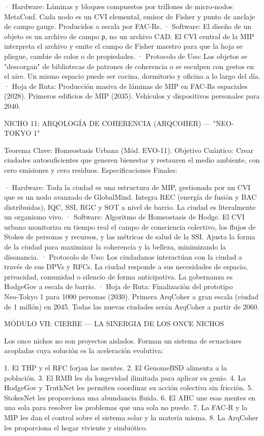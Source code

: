 \documentclass[12pt,a4paper]{book}
\begin{document}
· Hardware: Láminas y bloques compuestos por trillones de micro‑nodos MetaConf. Cada nodo es un CVI elemental, emisor de Fisher y punto de anclaje de campo gauge. Producidos a escala por FAC‑Rs.
· Software: El diseño de un objeto es un archivo de campo ρ, no un archivo CAD. El CVI central de la MIP interpreta el archivo y emite el campo de Fisher maestro para que la hoja se pliegue, cambie de color o de propiedades.
· Protocolo de Uso: Los objetos se "descorgan" de bibliotecas de patrones de coherencia o se esculpen con gestos en el aire. Un mismo espacio puede ser cocina, dormitorio y oficina a lo largo del día.
· Hoja de Ruta: Producción masiva de láminas de MIP en FAC‑Rs espaciales (2028). Primeros edificios de MIP (2035). Vehículos y dispositivos personales para 2040.

NICHO 11: ARQOLOGÍA DE COHERENCIA (ARQCOHER) — "NEO-TOKYO 1"

Teorema Clave: Homeostasis Urbana (Mód. EVO-11).
Objetivo Cuántico: Crear ciudades autosuficientes que generen bienestar y restauren el medio ambiente, con cero emisiones y cero residuos.
Especificaciones Finales:

· Hardware: Toda la ciudad es una estructura de MIP, gestionada por un CVI que es un nodo avanzado de GlobalMind. Integra REC (energía de fusión y BAC distribuidas), IQC, SSI, RGC y SOT a nivel de barrio. La ciudad es literalmente un organismo vivo.
· Software: Algoritmo de Homeostasis de Hodge. El CVI urbano monitoriza en tiempo real el campo de consciencia colectivo, los flujos de Stokes de personas y recursos, y las métricas de salud de la SSI. Ajusta la forma de la ciudad para maximizar la coherencia y la belleza, minimizando la disonancia.
· Protocolo de Uso: Los ciudadanos interactúan con la ciudad a través de sus DPVs y RFCs. La ciudad responde a sus necesidades de espacio, privacidad, comunidad o silencio de forma anticipativa. La gobernanza es HodgeGov a escala de barrio.
· Hoja de Ruta: Finalización del prototipo Neo‑Tokyo 1 para 1000 personas (2030). Primera ArqCoher a gran escala (ciudad de 1 millón) en 2045. Todas las nuevas ciudades serán ArqCoher a partir de 2060.

MÓDULO VII: CIERRE — LA SINERGIA DE LOS ONCE NICHOS

Los once nichos no son proyectos aislados. Forman un sistema de ecuaciones acopladas cuya solución es la aceleración evolutiva:

1. El THP y el RFC forjan las mentes.
2. El GenomeBSD alimenta a la población.
3. El RMB les da longevidad ilimitada para aplicar su genio.
4. La HodgeGov y TruthNet les permiten coordinar su acción colectiva sin fricción.
5. StokesNet les proporciona una abundancia fluida.
6. El AHC une esas mentes en una sola para resolver los problemas que una sola no puede.
7. La FAC‑R y la MIP les dan el control sobre el sistema solar y la materia misma.
8. La ArqCoher les proporciona el hogar viviente y simbiótico.
\end{document}
